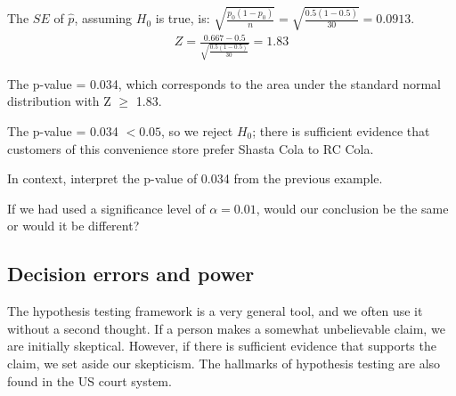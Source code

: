 \begin{examplewrap}
\begin{nexample}
\begin{description}
The $SE$ of $\hat{p}$, assuming $H_0$ is true, is: $\sqrt{\frac{p_0(1-p_0)}{n}}= \sqrt{\frac{0.5(1-0.5)}{30}} = 0.0913$.
\begin{align*}
Z = \frac{0.667 - 0.5}{\sqrt{\frac{0.5(1-0.5)}{30}}} = 1.83
\end{align*}
 \begin{center}
\end{center}
The p-value = 0.034, which corresponds to the area under the standard normal distribution with Z $\ge$ 1.83.
\item[\inferencestep{Conclude}]  The p-value = 0.034 $< 0.05$, so we reject $H_0$; there is sufficient evidence that customers of this convenience store prefer Shasta Cola to RC Cola.  
\end{description}
\end{nexample}
\end{examplewrap}


\begin{exercisewrap}
\begin{nexercise}
In context, interpret the p-value of 0.034 from the previous example.\footnotemark
\end{nexercise}
\end{exercisewrap}
\begin{exercisewrap}
\begin{nexercise}
If we had used a significance level of $\alpha=0.01$, would our conclusion be the same or would it be different?\footnotemark
\end{nexercise}
\end{exercisewrap}
\vspace{-10mm}
\newpage
\subsection{Decision errors and power}
The hypothesis testing framework is a very general tool, and we often use it without a second thought. If a person makes a somewhat unbelievable claim, we are initially skeptical. However, if there is sufficient evidence that supports the claim, we set aside our skepticism. The hallmarks of hypothesis testing are also found in the US court system. 

